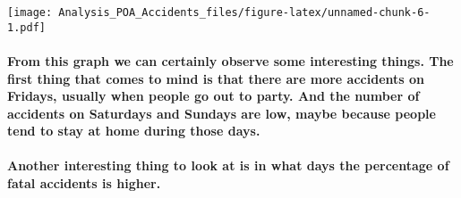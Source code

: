 \documentclass[]{article}
\let\oldparagraph\paragraph
\renewcommand{\paragraph}[1]{\oldparagraph{#1}\mbox{}}
\begin{document}
\texttt{[image: Analysis\_POA\_Accidents\_files/figure-latex/unnamed-chunk-6-1.pdf]}

\paragraph{From this graph we can certainly observe some interesting
things. The first thing that comes to mind is that there are more
accidents on Fridays, usually when people go out to party. And the
number of accidents on Saturdays and Sundays are low, maybe because
people tend to stay at home during those
days.}\label{from-this-graph-we-can-certainly-observe-some-interesting-things.-the-first-thing-that-comes-to-mind-is-that-there-are-more-accidents-on-fridays-usually-when-people-go-out-to-party.-and-the-number-of-accidents-on-saturdays-and-sundays-are-low-maybe-because-people-tend-to-stay-at-home-during-those-days.}

\paragraph{Another interesting thing to look at is in what days the
percentage of fatal accidents is
higher.}\label{another-interesting-thing-to-look-at-is-in-what-days-the-percentage-of-fatal-accidents-is-higher.}
\end{document}
